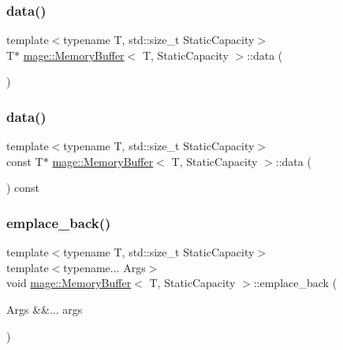 \mbox{\label{classmage_1_1_memory_buffer_a5b4ff0013b0ee1b657d7f7147379fa69}} 
\subsubsection{\texorpdfstring{data()}{data()}\hspace{0.1cm}{\footnotesize\ttfamily [1/2]}}
{\footnotesize\ttfamily template$<$typename T, std\+::size\+\_\+t Static\+Capacity$>$ \\
T$\ast$ \mbox{\hyperlink{classmage_1_1_memory_buffer}{mage\+::\+Memory\+Buffer}}$<$ T, Static\+Capacity $>$\+::data (\begin{DoxyParamCaption}{ }\end{DoxyParamCaption})\hspace{0.3cm}{\ttfamily [noexcept]}}

\mbox{\label{classmage_1_1_memory_buffer_a3ed335a3d83767be414b403f3d2aaf97}} 
\subsubsection{\texorpdfstring{data()}{data()}\hspace{0.1cm}{\footnotesize\ttfamily [2/2]}}
{\footnotesize\ttfamily template$<$typename T, std\+::size\+\_\+t Static\+Capacity$>$ \\
const T$\ast$ \mbox{\hyperlink{classmage_1_1_memory_buffer}{mage\+::\+Memory\+Buffer}}$<$ T, Static\+Capacity $>$\+::data (\begin{DoxyParamCaption}{ }\end{DoxyParamCaption}) const\hspace{0.3cm}{\ttfamily [noexcept]}}

\mbox{\label{classmage_1_1_memory_buffer_a6731a9292681e7b348bf91171cd967a3}} 
\subsubsection{\texorpdfstring{emplace\+\_\+back()}{emplace\_back()}}
{\footnotesize\ttfamily template$<$typename T, std\+::size\+\_\+t Static\+Capacity$>$ \\
template$<$typename... Args$>$ \\
void \mbox{\hyperlink{classmage_1_1_memory_buffer}{mage\+::\+Memory\+Buffer}}$<$ T, Static\+Capacity $>$\+::emplace\+\_\+back (\begin{DoxyParamCaption}\item[{Args \&\&...}]{args }\end{DoxyParamCaption})}

